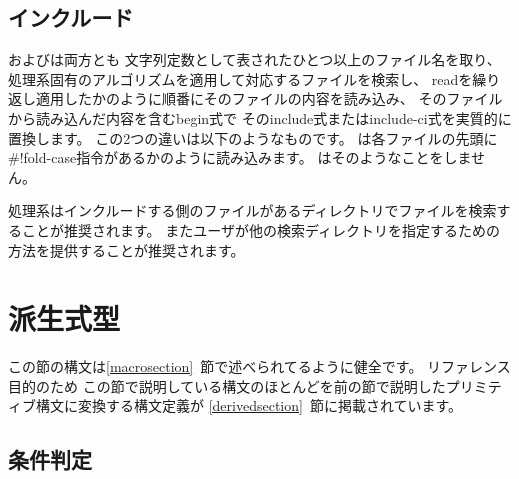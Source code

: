 \subsection{インクルード}\unsection
\label{inclusion}
\begin{entry}{%
}

\semantics
{}およびは両方とも
文字列定数として表されたひとつ以上のファイル名を取り、
処理系固有のアルゴリズムを適用して対応するファイルを検索し、
{\cf read}を繰り返し適用したかのように順番にそのファイルの内容を読み込み、
そのファイルから読み込んだ内容を含む{\cf begin}式で
その{\cf include}式または{\cf include-ci}式を実質的に置換します。
この2つの違いは以下のようなものです。
は各ファイルの先頭に {\cf{}\#!fold-case}指令があるかのように読み込みます。
はそのようなことをしません。

\begin{note}
処理系はインクルードする側のファイルがあるディレクトリでファイルを検索することが推奨されます。
またユーザが他の検索ディレクトリを指定するための方法を提供することが推奨されます。
\end{note}

\end{entry}

\section{派生式型}
\label{derivedexps}

この節の構文は\ref{macrosection}~節で述べられてるように健全です。
リファレンス目的のため
この節で説明している構文のほとんどを前の節で説明したプリミティブ構文に変換する構文定義が
\ref{derivedsection}~節に掲載されています。


\subsection{条件判定}\unsection

